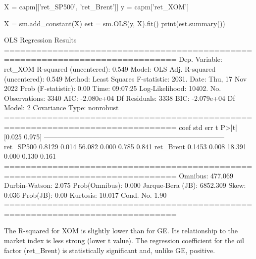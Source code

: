 \begin{ipython}
X = capm[['ret_SP500', 'ret_Brent']]
y = capm['ret_XOM']

X = sm.add_constant(X)
est = sm.OLS(y, X).fit()
print(est.summary())
\end{ipython} 
\begin{ioutput}
OLS Regression Results                                
==============================================================================
Dep. Variable:                ret_XOM   R-squared (uncentered):          0.549
Model:                            OLS   Adj. R-squared (uncentered):     0.549
Method:                 Least Squares   F-statistic:                     2031.
Date:                Thu, 17 Nov 2022   Prob (F-statistic):               0.00
Time:                        09:07:25   Log-Likelihood:                 10402.
No. Observations:                3340   AIC:                        -2.080e+04
Df Residuals:                    3338   BIC:                        -2.079e+04
Df Model:                           2                                                  
Covariance Type:            nonrobust                                                  
==============================================================================
coef    std err          t      P>|t|      [0.025      0.975]
------------------------------------------------------------------------------
ret_SP500      0.8129      0.014     56.082      0.000       0.785       0.841
ret_Brent      0.1453      0.008     18.391      0.000       0.130       0.161
==============================================================================
Omnibus:                      477.069   Durbin-Watson:                   2.075
Prob(Omnibus):                  0.000   Jarque-Bera (JB):             6852.309
Skew:                           0.036   Prob(JB):                         0.00
Kurtosis:                      10.017   Cond. No.                         1.90
==============================================================================
\end{ioutput}

The R-squared for XOM is slightly lower than for GE. Its relationship to the market index is less strong (lower t value).
The regression coefficient for the oil factor (ret\_Brent) is statistically significant and, unlike GE, positive.

